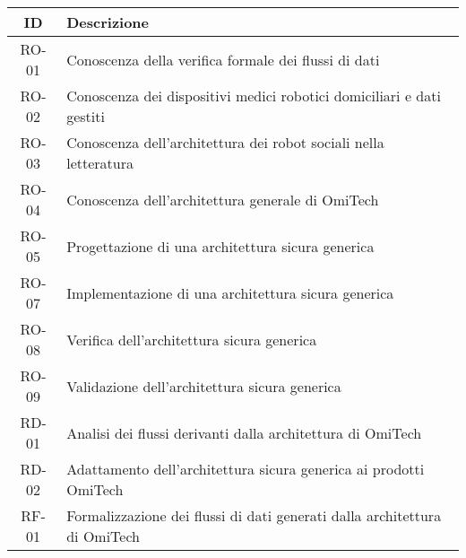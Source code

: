 \begin{tabularx}{\textwidth}{|c|X|}
    \hline
    \textbf{ID} & \textbf{Descrizione} \\
    \hline \hline
    RO-01 & Conoscenza della verifica formale dei flussi di dati \\
    \hdashline
    RO-02 & Conoscenza dei dispositivi medici robotici domiciliari e dati gestiti \\
    \hdashline
    RO-03 & Conoscenza dell'architettura dei robot sociali nella letteratura \\
    \hdashline
    RO-04 & Conoscenza dell'architettura generale di OmiTech \\
    \hdashline
    RO-05 & Progettazione di una architettura sicura generica \\
    \hdashline
    RO-07 & Implementazione di una architettura sicura generica \\
    \hdashline
    RO-08 & Verifica dell'architettura sicura generica \\
    \hdashline
    RO-09 & Validazione dell'architettura sicura generica \\
    \hline
    RD-01 & Analisi dei flussi derivanti dalla architettura di OmiTech \\
    \hdashline
    RD-02 & Adattamento dell'architettura sicura generica ai prodotti OmiTech \\
    \hline
    RF-01 & Formalizzazione dei flussi di dati generati dalla architettura di OmiTech \\
    \hline
\end{tabularx}
\newpage